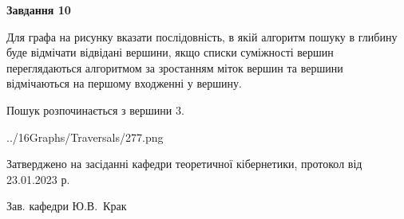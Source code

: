 \documentclass[12pt, ukrainian]{article}
\begin{document}
{\begin {large}
{\begin {center}\textbf{Завдання 10}\end {center}}\par
Для графа на рисунку вказати послідовність, в якій алгоритм пошуку в глибину буде відмічати відвідані вершини, якщо списки суміжності вершин переглядаються алгоритмом за зростанням міток вершин та вершини відмічаються на першому вход\-женні у вершину.\par
Пошук розпочинається з вершини 3.\par

\begin{center}
	{../16Graphs/Traversals/277.png}
\end{center}\par
\newpage


\end {large}
}
{\smallskip \begin {small} Затверджено на засіданні кафедри теоретичної кібернетики, протокол  від   23.01.2023 р.\par\smallskip\smallskip
{\parbox {6.5 cm}{Зав. кафедри \dotfill Ю.В.~Крак}} \end{small}}
\end{document}
